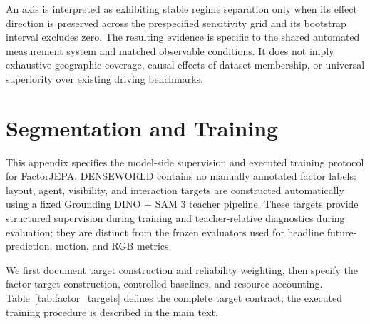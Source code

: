 An axis is interpreted as exhibiting stable regime separation only
when its effect direction is preserved across the prespecified
sensitivity grid and its bootstrap interval excludes zero. The resulting evidence
is specific to the shared automated measurement system and matched
observable conditions. It does not imply exhaustive geographic
coverage, causal effects of dataset membership, or universal
superiority over existing driving benchmarks.















































\section{Segmentation and Training}
\label{app:factor_reproducibility}

This appendix specifies the model-side supervision and executed training
protocol for FactorJEPA. DENSEWORLD contains no manually annotated
factor labels: layout, agent, visibility, and interaction targets are
constructed automatically using a fixed Grounding DINO + SAM 3 teacher pipeline.
These targets provide structured supervision during training and
teacher-relative diagnostics during evaluation; they are distinct from
the frozen evaluators used for headline future-prediction, motion, and
RGB metrics.

We first document target construction and reliability weighting, then
specify the factor-target construction, controlled
baselines, and resource accounting. Table~\ref{tab:factor_targets}
defines the complete target contract; the executed training procedure
is described in the main text.


